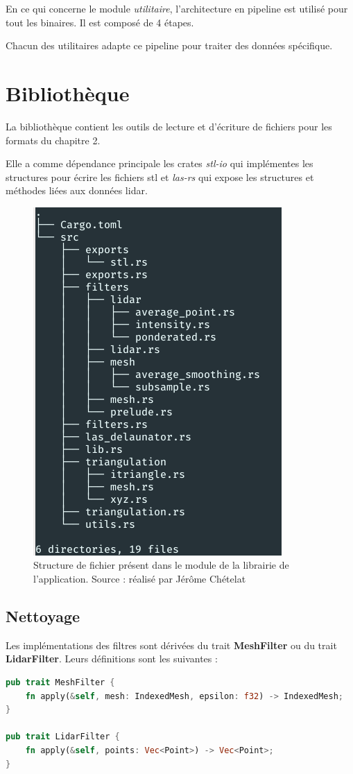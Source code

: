 En ce qui concerne le module \textit{utilitaire}, l'architecture en pipeline est
utilisé pour tout les binaires. Il est composé de 4 étapes. 

Chacun des utilitaires adapte ce pipeline pour traiter des données spécifique.

\section{Bibliothèque}

La bibliothèque contient les outils de lecture et d'écriture de fichiers pour les formats du chapitre 2.

Elle a comme dépendance principale les crates \textit{stl-io}
qui implémentes les structures pour écrire les fichiers \gls{stl} 
et \textit{las-rs} qui expose les structures et méthodes liées aux données lidar.

\begin{figure}[htbp!]
    \centering
    \includegraphics[width=0.5\linewidth]{figures/architecture.png}
    \caption{Structure de fichier présent dans le module de la librairie de l'application. Source : réalisé par Jérôme Chételat}
    \label{fig:library_tree}
\end{figure}

\subsection{Nettoyage}
Les implémentations des filtres sont dérivées du trait \textbf{MeshFilter} ou du trait \textbf{LidarFilter}. Leurs définitions sont les suivantes :
\begin{lstlisting}[language=Rust, style=boxed]
pub trait MeshFilter {
    fn apply(&self, mesh: IndexedMesh, epsilon: f32) -> IndexedMesh;
}

pub trait LidarFilter {
    fn apply(&self, points: Vec<Point>) -> Vec<Point>;
}

\end{lstlisting}

